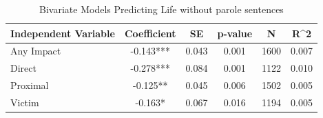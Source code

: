 \begin{table}

\caption{\label{tab:tab:lwop_rev_bivariate}Bivariate Models Predicting Life without parole sentences}
\centering
\begin{tabular}[t]{lccccc}
\toprule
Independent Variable & Coefficient & SE & p-value & N & R\textasciicircum{}2\\
\midrule
Any Impact & -0.143*** & 0.043 & 0.001 & 1600 & 0.007\\
Direct & -0.278*** & 0.084 & 0.001 & 1122 & 0.010\\
Proximal & -0.125** & 0.045 & 0.006 & 1502 & 0.005\\
Victim & -0.163* & 0.067 & 0.016 & 1194 & 0.005\\
\bottomrule
\end{tabular}
\end{table}
